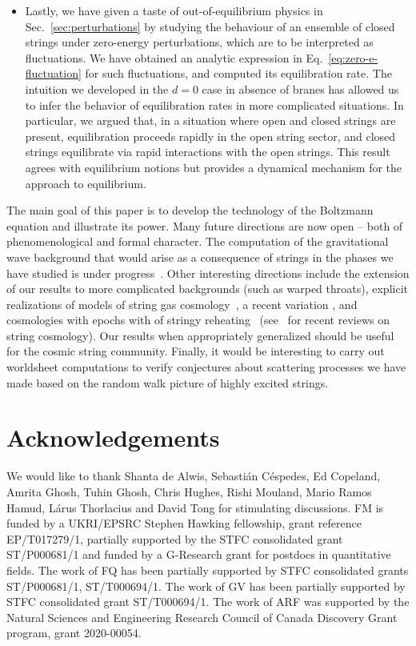 \documentclass[a4paper,11pt]{article}
\begin{document}
\begin{itemize}
\item Lastly, we have given a taste of out-of-equilibrium physics in Sec.~\ref{sec:perturbations} by studying the behaviour of an ensemble of closed strings under zero-energy perturbations, which are to be interpreted as fluctuations.
    We have obtained an analytic expression in Eq.~\eqref{eq:zero-e-fluctuation} for such fluctuations, and computed its equilibration rate.
    The intuition we developed in the $d=0$ case in absence of branes has allowed us to infer the behavior of equilibration rates in more complicated situations.
    In particular, we argued that, in a situation where open and closed strings are present, equilibration proceeds rapidly in the open string sector, and closed strings equilibrate via rapid interactions with the open strings.
    This result agrees with equilibrium notions but provides a dynamical mechanism for the approach to equilibrium.
\end{itemize}

The main goal of this paper is to develop the technology of the Boltzmann equation and illustrate its power.
Many future directions are now open -- both of  phenomenological and formal character.
The computation of the gravitational wave background that would arise as a consequence of strings in the phases we have studied is under progress~\cite{Frey:2024in}.
Other interesting directions include the  extension of our results to more complicated backgrounds (such as warped throats), explicit realizations of models of string gas cosmology~\cite{Brandenberger:1988aj, Brandenberger:2006vv, Brandenberger:2006xi, Nayeri:2005ck}, a recent variation \cite{Melcher:2023kpd}, and cosmologies
with epochs with of stringy reheating~\cite{Frey:2005jk, DiMarco:2019czi,Apers:2022cyl,Conlon:2022pnx}
(see~\cite{Cicoli:2023opf, Brandenberger:2023ver} for recent reviews on string cosmology).
Our results when appropriately generalized  should be useful  for the cosmic string community. Finally, it would be interesting to carry out worldsheet computations to verify conjectures about scattering processes we have made based on the random walk picture of highly excited strings.

\section*{Acknowledgements}

We would like to thank Shanta de Alwis, Sebastián Céspedes, Ed Copeland, Amrita Ghosh, Tuhin Ghosh, Chris Hughes, Rishi Mouland, Mario Ramos Hamud, Lárus Thorlacius and David Tong for stimulating discussions.
FM is funded by a UKRI/EPSRC Stephen Hawking fellowship, grant reference EP/T017279/1, partially supported by the STFC consolidated grant ST/P000681/1 and funded by a G-Research grant for postdocs in quantitative fields.
 The work of FQ has been partially supported by STFC consolidated grants ST/P000681/1, ST/T000694/1. The work of GV has been partially supported by STFC consolidated grant ST/T000694/1. The work of ARF was supported by the Natural Sciences and Engineering Research Council of Canada Discovery Grant program, grant 2020-00054. 
\end{document}
